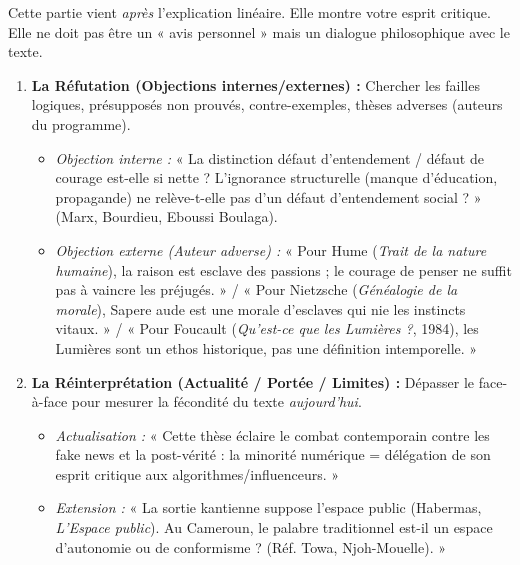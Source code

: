 \documentclass[11pt]{article}
\newcommand{\cle}[1]{{\popxbold\color{popdark}#1}}
\begin{document}
\begin{methode}
    Cette partie vient \emph{après} l'explication linéaire. Elle montre votre esprit critique. Elle ne doit pas être un « avis personnel » mais un \cle{dialogue philosophique} avec le texte.
    \begin{enumerate}
        \item \textbf{La Réfutation (Objections internes/externes) :} Chercher les \cle{failles logiques}, \cle{présupposés non prouvés}, \cle{contre-exemples}, \cle{thèses adverses} (auteurs du programme).
            \begin{itemize}
                \item \emph{Objection interne :} « La distinction défaut d'entendement / défaut de courage est-elle si nette ? L'ignorance structurelle (manque d'éducation, propagande) ne relève-t-elle pas d'un \guillemotleft défaut d'entendement \guillemotright social ? » (Marx, Bourdieu, \cle{Eboussi Boulaga}).
                \item \emph{Objection externe (Auteur adverse) :} « Pour \cle{Hume} (\emph{Trait de la nature humaine}), la raison est esclave des passions ; le \guillemotleft courage \guillemotright de penser ne suffit pas à vaincre les préjugés. » / « Pour \cle{Nietzsche} (\emph{Généalogie de la morale}), \guillemotleft Sapere aude \guillemotright est une morale d'esclaves qui nie les instincts vitaux. » / « Pour \cle{Foucault} (\emph{Qu'est-ce que les Lumières ?}, 1984), les Lumières sont un \guillemotleft ethos \guillemotright historique, pas une définition intemporelle. »
            \end{itemize}
        \item \textbf{La Réinterprétation (Actualité / Portée / Limites) :} Dépasser le face-à-face pour mesurer la fécondité du texte \emph{aujourd'hui}.
            \begin{itemize}
                \item \emph{Actualisation :} « Cette thèse éclaire le combat contemporain contre les \cle{fake news} et la \cle{post-vérité} : la minorité numérique = délégation de son esprit critique aux algorithmes/influenceurs. »
                \item \emph{Extension :} « La \guillemotleft sortie \guillemotright kantienne suppose l'espace public (\cle{Habermas}, \emph{L'Espace public}). Au Cameroun, le \cle{palabre} traditionnel est-il un espace d'autonomie ou de conformisme ? (Réf. \cle{Towa}, \cle{Njoh-Mouelle}). »

\end{itemize}
\end{enumerate}
\end{methode}
\end{document}

